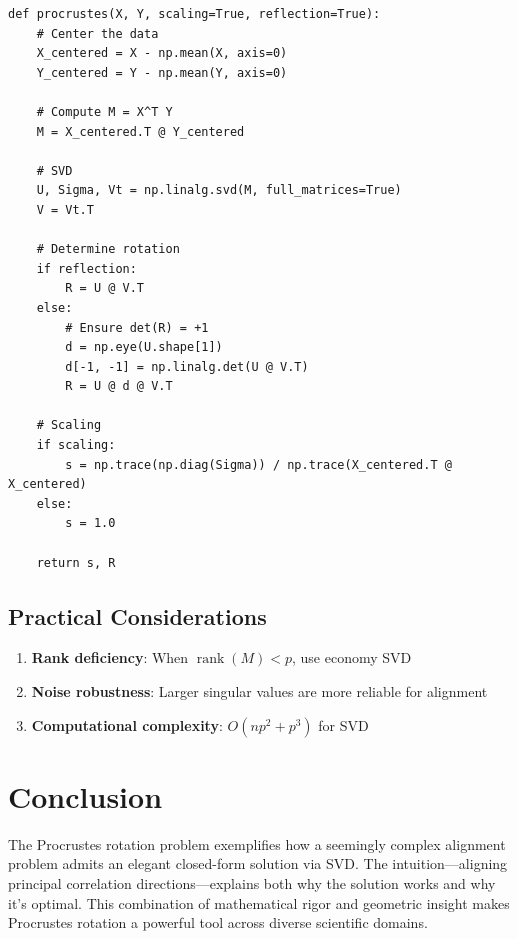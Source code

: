 \documentclass[11pt]{article}
\begin{document}
\begin{verbatim}
def procrustes(X, Y, scaling=True, reflection=True):
    # Center the data
    X_centered = X - np.mean(X, axis=0)
    Y_centered = Y - np.mean(Y, axis=0)
    
    # Compute M = X^T Y
    M = X_centered.T @ Y_centered
    
    # SVD
    U, Sigma, Vt = np.linalg.svd(M, full_matrices=True)
    V = Vt.T
    
    # Determine rotation
    if reflection:
        R = U @ V.T
    else:
        # Ensure det(R) = +1
        d = np.eye(U.shape[1])
        d[-1, -1] = np.linalg.det(U @ V.T)
        R = U @ d @ V.T
    
    # Scaling
    if scaling:
        s = np.trace(np.diag(Sigma)) / np.trace(X_centered.T @ X_centered)
    else:
        s = 1.0
    
    return s, R
\end{verbatim}

\subsection{Practical Considerations}
\label{subsec:practical}

\begin{enumerate}
    \item \textbf{Rank deficiency}: When $\operatorname{rank}(M) < p$, use economy SVD
    \item \textbf{Noise robustness}: Larger singular values are more reliable for alignment
    \item \textbf{Computational complexity}: $O(np^2 + p^3)$ for SVD
\end{enumerate}

\section{Conclusion}
\label{sec:conclusion}

The Procrustes rotation problem exemplifies how a seemingly complex alignment problem admits an elegant closed-form solution via SVD. The intuition—aligning principal correlation directions—explains both why the solution works and why it's optimal. This combination of mathematical rigor and geometric insight makes Procrustes rotation a powerful tool across diverse scientific domains.
\end{document}
